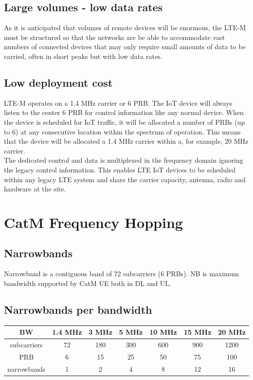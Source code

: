 \documentclass[12pt]{article}
\newcommand\tab[1][1cm]{\hspace*{#1}}
\begin{document}
\begin{description}
\pagebreak
\subsection{Large volumes - low data rates}
 \item[\label{Large volumes - low data rates}]{
\tab As it is anticipated that volumes of remote devices will be enormous, the
LTE-M must be structured so that the networks are be able to
accommodate vast numbers of connected devices that may only require
small amounts of data to be carried, often in short peaks but with low data
rates. 
}

\subsection{Low deployment cost}
 \item[\label{Low deployment cost}]{
 \tab LTE-M operates on a 1.4 MHz carrier or 6 PRB. The IoT device will always listen to the center 6
PRB for control information like any normal device. When the device is scheduled for IoT traffic, it
will be allocated a number of PRBs (up to 6) at any consecutive location within the spectrum of
operation. This means that the device will be allocated a 1.4 MHz carrier within a, for example, 20
MHz carrier.\\
The dedicated control and data is multiplexed in the frequency domain ignoring the legacy control
information. This enables LTE IoT devices to be scheduled within any legacy LTE system and
share the carrier capacity, antenna, radio and hardware at the site. 

} 
\end{description}

\pagebreak
\section{CatM Frequency Hopping}
\subsection{Narrowbands}
Narrowband is a contiguous band of 72 subcarriers (6 PRBs).
NB is maximum bandwidth supported by CatM UE both in DL and UL.
\subsection{Narrowbands per bandwidth}
\begin{center}
\begin{tabular}{|c|c|c|c|c|c|c|}
\hline
BW & 1.4 MHz & 3 MHz & 5 MHz & 10 MHz & 15 MHz & 20 MHz  \\
\hline 
subcarriers & 72 & 180 & 300 & 600 & 900 & 1200  \\
\hline 
PRB & 6 & 15 & 25 & 50 & 75 & 100 \\ 
\hline 
narrowbands & 1 & 2 & 4 & 8 & 12 & 16 \\
\hline 
\end{tabular} 
\end{center}
\end{document}
